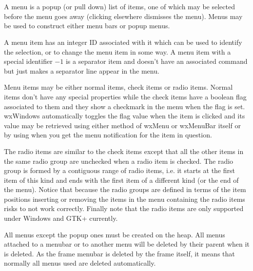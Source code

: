 \section{}\label{wxmenu}

A menu is a popup (or pull down) list of items, one of which may be
selected before the menu goes away (clicking elsewhere dismisses the
menu). Menus may be used to construct either menu bars or popup menus.

A menu item has an integer ID associated with it which can be used to
identify the selection, or to change the menu item in some way. A menu item
with a special identifier $-1$ is a separator item and doesn't have an
associated command but just makes a separator line appear in the menu.

Menu items may be either normal items, check items or radio items. Normal items
don't have any special properties while the check items have a boolean flag
associated to them and they show a checkmark in the menu when the flag is set.
wxWindows automatically toggles the flag value when the item is clicked and its
value may be retrieved using either  method
of wxMenu or wxMenuBar itself or by using 
 when you get the menu
notification for the item in question.

The radio items are similar to the check items except that all the other items
in the same radio group are unchecked when a radio item is checked. The radio
group is formed by a contiguous range of radio items, i.e. it starts at the
first item of this kind and ends with the first item of a different kind (or
the end of the menu). Notice that because the radio groups are defined in terms
of the item positions inserting or removing the items in the menu containing
the radio items risks to not work correctly. Finally note that the radio items
are only supported under Windows and GTK+ currently.


All menus except the popup ones must be created on the heap. All menus
attached to a menubar or to another menu will be deleted by their parent when
it is deleted. As the frame menubar is deleted by the frame itself, it means
that normally all menus used are deleted automatically.


\\

